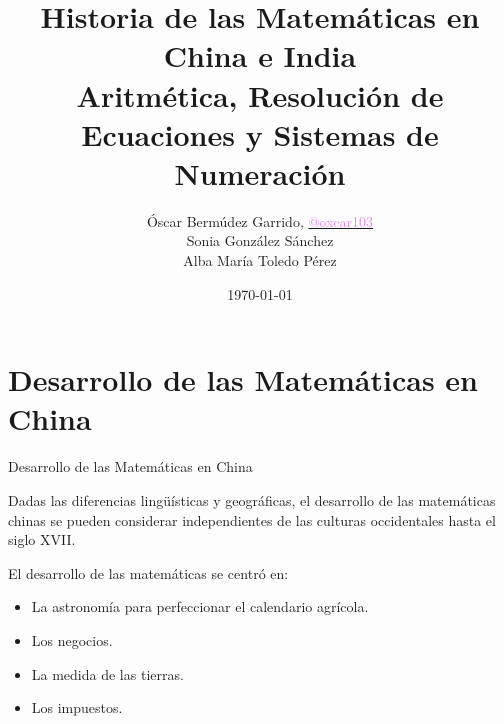 \documentclass[compress, aspectratio=169]{beamer} %
\title[Historia de las Matemáticas en China e India]{\Large Historia de las Matemáticas en China e India\\
\normalsize Aritmética, Resolución de Ecuaciones y Sistemas de Numeración} %
\author[Óscar Bermúdez, Sonia González, Alba Mª Toledo]{
	Óscar Bermúdez Garrido, \href{http://www.github.com/oxcar103}{\textcolor{violet}{@oxcar103}}\\
	Sonia González Sánchez \\
	Alba María Toledo Pérez
} %
\institute[UGR] %
{
  Universidad de Granada \\ %
}
\date{\today} %
\begin{document}
\begin{frame}
	\titlepage %
\end{frame}


 


\section{Desarrollo de las Matemáticas en China}
	\begin{frame}
		\Huge{\centerline{Desarrollo de las Matemáticas en China}}
	\end{frame}

	\begin{frame}
		Dadas las diferencias lingüísticas y geográficas, el desarrollo de las matemáticas chinas se pueden considerar
		independientes de las culturas occidentales hasta el siglo XVII.
		
		\pause
		
		El desarrollo de las matemáticas se centró en:
		\begin{itemize}
			\item La astronomía para perfeccionar el calendario agrícola.
			\item Los negocios.
			\item La medida de las tierras.
			\item Los impuestos.
		\end{itemize}
	\end{frame}
\end{document}
